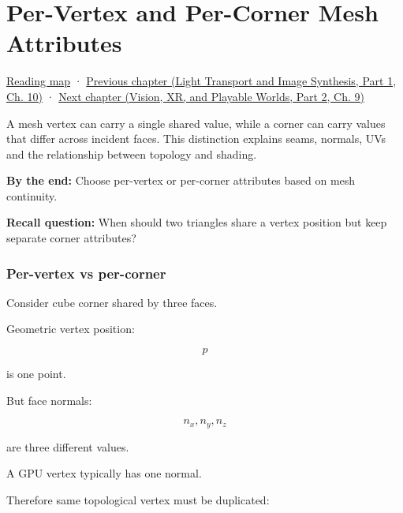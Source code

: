 \chapter{Per-Vertex and Per-Corner Mesh Attributes}\label{04-visual-computing-ii-ch041-per-vertex-and-per-corner-mesh-attributes}\hypertarget{04-visual-computing-ii-ch041}{}\label{stagechapter:04-visual-computing-ii-ch041}

\hypertarget{04-visual-computing-ii-ch041-per-vertex-and-per-corner-mesh-attributes}{}

\hyperref[volume-reading-map]{Reading map} · \href{../04-Light-Transport-and-Image-Synthesis-P01/main.pdf\#nameddest=04-visual-computing-ii-ch040-lighting-reconstruction-and-surface-motion}{Previous chapter (Light Transport and Image Synthesis, Part 1, Ch. 10)} · \href{../07-Vision-XR-and-Playable-Worlds-P02/main.pdf\#nameddest=04-visual-computing-ii-ch042-xr-radiometry-optics-and-perception}{Next chapter (Vision, XR, and Playable Worlds, Part 2, Ch. 9)}

A mesh vertex can carry a single shared value, while a corner can carry values that differ across incident faces. This distinction explains seams, normals, UVs and the relationship between topology and shading.

\textbf{By the end:} Choose per-vertex or per-corner attributes based on mesh continuity.

\textbf{Recall question:} When should two triangles share a vertex position but keep separate corner attributes?

\subsection{Per-vertex vs per-corner}\label{04-visual-computing-ii-ch041-per-vertex-vs-per-corner}

\hypertarget{04-visual-computing-ii-ch041-per-vertex-vs-per-corner}{}

Consider cube corner shared by three faces.

Geometric vertex position:

\[
p
\]

is one point.

But face normals:

\[
n_x,n_y,n_z
\]

are three different values.

A GPU vertex typically has one normal.

Therefore same topological vertex must be duplicated:

